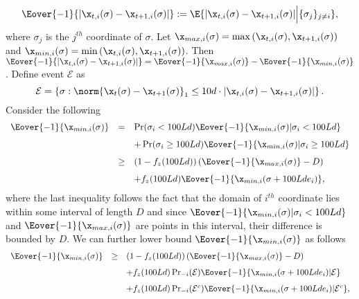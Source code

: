$$\Eover{-1}{|\x_{t,i}(\sigma) - \x_{t+1,i}(\sigma)|} := \E{|\x_{t,i}(\sigma) - \x_{t+1,i}(\sigma)|\Big| \{\sigma_{j}\}_{j\neq i}},$$
where $\sigma_j$ is the $j^{th}$ coordinate of $\sigma$.  Let $\x_{max,i}(\sigma) = \max\left(\x_{t,i}(\sigma), \x_{t+1,i}(\sigma)\right)$ and $\x_{min,i}(\sigma) = \min\left(\x_{t,i}(\sigma), \x_{t+1,i}(\sigma)\right)$. Then $\Eover{-1}{|\x_{t,i}(\sigma) - \x_{t+1,i}(\sigma)|} = \Eover{-1}{\x_{max,i}(\sigma)} - \Eover{-1}{\x_{min,i}(\sigma)}$. 
Define  event $\mathcal{E}$ as 
$$\mathcal{E} = \left\lbrace \sigma :\norm{\x_{t}(\sigma)-\x_{t+1}(\sigma)}_1 \leq {10  d} \cdot |\x_{t,i}(\sigma)-\x_{t+1,i}(\sigma)|\right\rbrace.$$ 
Consider the following
\begin{equation*}
    \begin{array}{lll}
         \Eover{-1}{\x_{min,i}(\sigma)}  &=& \Pr(\sigma_i < 100Ld) \Eover{-1}{\x_{min,i}(\sigma)|\sigma_i < 100Ld} \vspace{0.1in}\\
         && + \Pr(\sigma_i \geq 100Ld) \Eover{-1}{\x_{min,i}(\sigma) |\sigma_i \geq 100Ld}\vspace{0.1in}\\
         &\geq& \left(1-f_z(100Ld)\right)(\Eover{-1}{\x_{max, i}(\sigma)}-D) \vspace{0.1in}\\
         && + f_z(100Ld)\Eover{-1}{\x_{min,i}(\sigma+100Lde_i)},
\end{array}
\end{equation*}
where the last inequality follows  the fact that the domain of $i^{th}$ coordinate lies within some interval of length $D$ and since $\Eover{-1}{\x_{min,i}(\sigma)|\sigma_i < 100Ld}$ and $\Eover{-1}{\x_{max, i}(\sigma)}$ are points in this interval, their difference is bounded by $D$. We can further lower bound $\Eover{-1}{\x_{min,i}(\sigma)}$ as follows
\begin{equation*}
    \begin{array}{lll}
         \Eover{-1}{\x_{min,i}(\sigma)} 
         &\geq & \left(1-f_z(100Ld)\right)(\Eover{-1}{\x_{max, i}(\sigma)}-D)\vspace{0.1in}\\
         && + f_z(100Ld)\Pr_{-i}(\mathcal{E})\Eover{-1}{\x_{min,i}(\sigma+100Lde_i) | \mathcal{E}} \vspace{0.1in}\\
         && + f_z(100Ld)\Pr_{-i}(\mathcal{E}^c)\Eover{-1}{\x_{min,i}(\sigma+100Lde_i) | \mathcal{E}^c},
\end{array}
\end{equation*}
